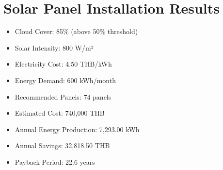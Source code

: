 \documentclass[12pt]{article}
\begin{document}
\section{Solar Panel Installation Results}
\begin{itemize}
    \item Cloud Cover: 85\% (above 50\% threshold)
    \item Solar Intensity: 800 W/m²
    \item Electricity Cost: 4.50 THB/kWh
    \item Energy Demand: 600 kWh/month
    \item Recommended Panels: 74 panels
    \item Estimated Cost: 740,000 THB
    \item Annual Energy Production: 7,293.00 kWh
    \item Annual Savings: 32,818.50 THB
    \item Payback Period: 22.6 years
\end{itemize}
\end{document}
